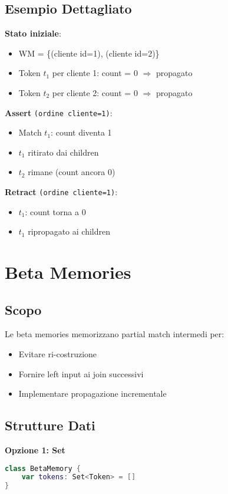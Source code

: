 \subsection{Esempio Dettagliato}

\textbf{Stato iniziale}:
\begin{itemize}
\item WM = \{(cliente id=1), (cliente id=2)\}
\item Token $t_1$ per cliente 1: count = 0 $\Rightarrow$ propagato
\item Token $t_2$ per cliente 2: count = 0 $\Rightarrow$ propagato
\end{itemize}

\textbf{Assert} \texttt{(ordine cliente=1)}:
\begin{itemize}
\item Match $t_1$: count diventa 1
\item $t_1$ ritirato dai children
\item $t_2$ rimane (count ancora 0)
\end{itemize}

\textbf{Retract} \texttt{(ordine cliente=1)}:
\begin{itemize}
\item $t_1$: count torna a 0
\item $t_1$ ripropagato ai children
\end{itemize}

\section{Beta Memories}

\subsection{Scopo}

Le beta memories memorizzano partial match intermedi per:
\begin{itemize}
\item Evitare ri-costruzione
\item Fornire left input ai join successivi
\item Implementare propagazione incrementale
\end{itemize}

\subsection{Strutture Dati}

\textbf{Opzione 1: Set}
\begin{lstlisting}[language=Swift]
class BetaMemory {
    var tokens: Set<Token> = []
}
\end{lstlisting}

